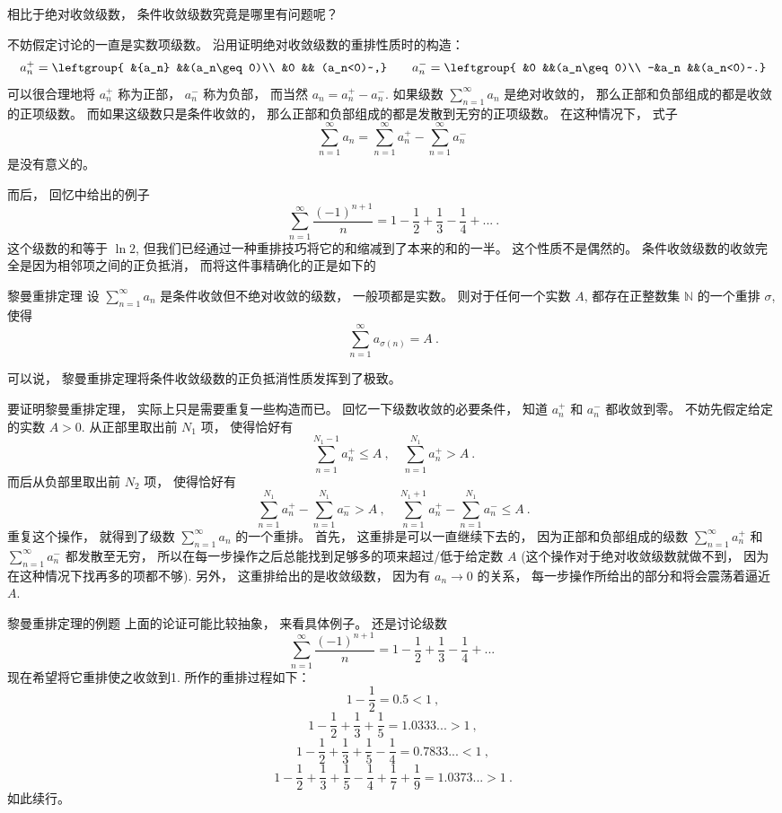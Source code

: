 

相比于绝对收敛级数， 条件收敛级数究竟是哪里有问题呢？ 

不妨假定讨论的一直是实数项级数。 沿用证明绝对收敛级数的重排性质时的构造： 
$$
a_n^+=\leftgroup{
&{a_n} &&(a_n\geq0)\\
&0 && (a_n<0)~,}
\qquad
a_n^-=\leftgroup{
&0 &&(a_n\geq0)\\
-&a_n &&(a_n<0)~.}
$$
可以很合理地将 $a_n^+$ 称为正部， $a_n^-$ 称为负部， 而当然 $a_n=a_n^+-a_n^-$. 如果级数 $\sum_{n=1}^\infty a_n$ 是绝对收敛的， 那么正部和负部组成的都是收敛的正项级数。 而如果这级数只是条件收敛的， 那么正部和负部组成的都是发散到无穷的正项级数。 在这种情况下， 式子
$$
\sum_{n=1}^\infty a_n=\sum_{n=1}^\infty a_n^+-\sum_{n=1}^\infty a_n^-~
$$
是没有意义的。

而后， 回忆中给出的例子
$$
\sum_{n=1}^\infty\frac{(-1)^{n+1}}{n}
=1-\frac{1}{2}+\frac{1}{3}-\frac{1}{4}+...~.
$$
这个级数的和等于 $\ln2$, 但我们已经通过一种重排技巧将它的和缩减到了本来的和的一半。 这个性质不是偶然的。 条件收敛级数的收敛完全是因为相邻项之间的正负抵消， 而将这件事精确化的正是如下的

\begin{theorem}{黎曼重排定理}
设 $\sum_{n=1}^\infty a_n$ 是条件收敛但不绝对收敛的级数， 一般项都是实数。 则对于任何一个实数 $A$, 都存在正整数集 $\mathbb{N}$ 的一个重排 $\sigma$, 使得
$$
\sum_{n=1}^\infty a_{\sigma(n)}=A~.
$$
\end{theorem}

可以说， 黎曼重排定理将条件收敛级数的正负抵消性质发挥到了极致。

要证明黎曼重排定理， 实际上只是需要重复一些构造而已。 回忆一下级数收敛的必要条件， 知道 $a_n^+$ 和 $a_n^-$ 都收敛到零。 不妨先假定给定的实数 $A>0$. 从正部里取出前 $N_1$ 项， 使得恰好有
\[
\sum_{n=1}^{N_1-1}a_n^+\leq A~,
\quad
\sum_{n=1}^{N_1}a_n^+> A~.
\]
而后从负部里取出前 $N_2$ 项， 使得恰好有
\[
\sum_{n=1}^{N_1}a_n^+-\sum_{n=1}^{N_1}a_n^-> A~,
\quad
\sum_{n=1}^{N_1+1}a_n^+-\sum_{n=1}^{N_1}a_n^-\leq A~.
\]
重复这个操作， 就得到了级数 $\sum_{n=1}^\infty a_n$ 的一个重排。 首先， 这重排是可以一直继续下去的， 因为正部和负部组成的级数 $\sum_{n=1}^\infty a_n^+$ 和 $\sum_{n=1}^\infty a_n^-$ 都发散至无穷， 所以在每一步操作之后总能找到足够多的项来超过/低于给定数 $A$ (这个操作对于绝对收敛级数就做不到， 因为在这种情况下找再多的项都不够). 另外， 这重排给出的是收敛级数， 因为有 $a_n\to0$ 的关系， 每一步操作所给出的部分和将会震荡着逼近 $A$.

\begin{example}{黎曼重排定理的例题}
上面的论证可能比较抽象， 来看具体例子。 还是讨论级数
$$
\sum_{n=1}^\infty\frac{(-1)^{n+1}}{n}
=1-\frac{1}{2}+\frac{1}{3}-\frac{1}{4}+...~
$$
现在希望将它重排使之收敛到1. 所作的重排过程如下：
$$
1-\frac{1}{2}=0.5<1~,
$$ 
$$
1-\frac{1}{2}+\frac{1}{3}+\frac{1}{5}=1.0333...>1~,
$$ 
$$
1-\frac{1}{2}+\frac{1}{3}+\frac{1}{5}-\frac{1}{4}=0.7833...<1~,
$$ 
$$
1-\frac{1}{2}+\frac{1}{3}+\frac{1}{5}-\frac{1}{4}+\frac{1}{7}+\frac{1}{9}=1.0373...>1~.
$$
如此续行。
\end{example}
